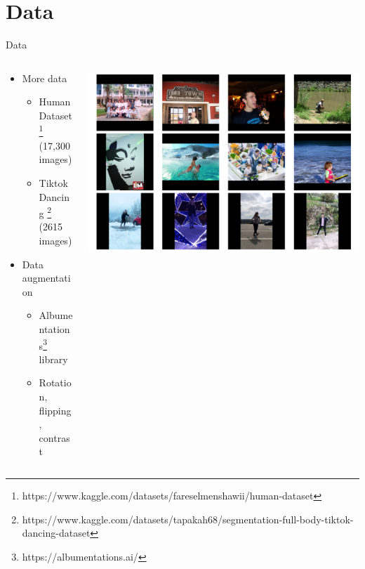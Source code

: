 \documentclass[en]{sdqbeamer}
\begin{document}
\section{Data}
\begin{frame}[t]{Data}
  \begin{columns}
    \begin{column}{0.45\textwidth}
      \begin{itemize}
      \item More data
        \begin{itemize}
        \item Human Dataset
          \footnote{https://www.kaggle.com/datasets/fareselmenshawii/human-dataset} (17,300 images)
        \item Tiktok Dancing
          \footnote{https://www.kaggle.com/datasets/tapakah68/segmentation-full-body-tiktok-dancing-dataset} (2615 images)
        \end{itemize}

      \item Data augmentation
        \begin{itemize}
        \item Albumentations\footnote{https://albumentations.ai/} library
        \item Rotation, flipping, contrast
        \end{itemize}
      \end{itemize}
    \end{column}
    \begin{column}{0.55\textwidth}
      \includegraphics[scale=0.22]{data_grid}
    \end{column}
  \end{columns}
\end{frame}
\end{document}
